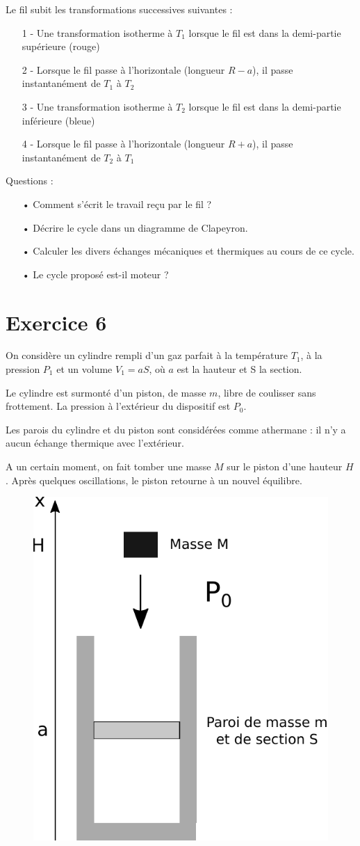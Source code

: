 \documentclass{report}
\begin{document}
Le fil subit les transformations successives suivantes :
\begin{itemize}
\item[1 -] Une transformation isotherme à $T_1$ lorsque le fil est dans la demi-partie supérieure (rouge)
\item[2 -] Lorsque le fil passe à l'horizontale (longueur $R-a$), il passe instantanément de $T_1$ à $T_2$
\item[3 -] Une transformation isotherme à $T_2$ lorsque le fil est dans la demi-partie inférieure (bleue)
\item[4 -] Lorsque le fil passe à l'horizontale (longueur $R+a$), il passe instantanément de $T_2$ à $T_1$
\end{itemize}
Questions : 
\begin{itemize}
\item[•] Comment s'écrit le travail reçu par le fil ?
\item[•] Décrire le cycle dans un diagramme de Clapeyron.
\item[•] Calculer les divers échanges mécaniques et thermiques au cours de ce cycle.
\item[•] Le cycle proposé est-il moteur ?
\end{itemize}

\newpage

\section*{Exercice 6}

On considère un cylindre rempli d'un gaz parfait à la température $T_1$, à la pression $P_1$ et un volume $V_1=aS$, où $a$ est la hauteur et S la section.

Le cylindre est surmonté d'un piston, de masse $m$, libre de coulisser sans frottement. La pression à l'extérieur du dispositif est $P_0$.

Les parois du cylindre et du piston sont considérées comme athermane : il n'y a aucun échange thermique avec l'extérieur.

A un certain moment, on fait tomber une masse $M$ sur le piston d'une hauteur $H$. Après quelques oscillations, le piston retourne à un nouvel équilibre.


\begin{figure}[!h]
\centering
\includegraphics[width=0.5\linewidth]{thermo4.pdf}
\end{figure}
\end{document}
